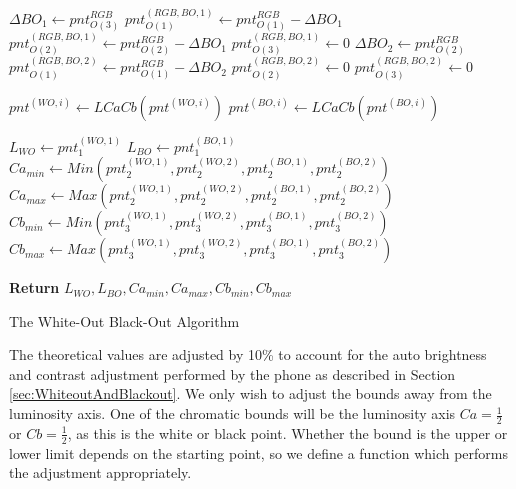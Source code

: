 \begin{algorithm}[H]
\begin{algorithmic}
     
   \State  $\Delta BO_1 \gets  pnt^{RGB}_{O(3)} $ 
   \State  \phantom{Set}$pnt^{(RGB, BO, 1)}_{O(1)} \gets  pnt^{RGB} _{O(1)} - \Delta BO_1  $ 
   \State \phantom{Set} $pnt^{(RGB, BO, 1)}_{O(2)} \gets  pnt^{RGB} _{O(2)} - \Delta BO_1 $ 
   \State \phantom{Set} $pnt^{(RGB, BO, 1)}_{O(3)} \gets  0 $ 
   \State  $\Delta BO_2 \gets pnt^{RGB}_{O(2)} $ 
   \State  \phantom{Set} $pnt^{(RGB, BO, 2)}_{O(1)} \gets pnt^{RGB} _{O(1)} - \Delta BO_2 $ 
   \State  \phantom{Set} $pnt^{(RGB, BO, 2)}_{O(2)} \gets 0 $ 
   \State  \phantom{Set} $pnt^{(RGB, BO, 2)}_{O(3)} \gets 0 $ 
     
   \State  $pnt^{(WO, i)}\gets LCaCb(pnt^{(WO, i)}) $ 
   \State  $pnt^{(BO, i)}\gets LCaCb(pnt^{(BO, i)}) $ 
   
   \State  $L_{WO} \gets pnt^{(WO, 1)}_1$ 
   \State  $L_{BO} \gets pnt^{(BO, 1)}_1$ 
   \State  $Ca_{min}  \gets Min(pnt^{(WO, 1)}_2, pnt^{(WO, 2)}_2, pnt^{(BO, 1)}_2, pnt^{(BO, 2)}_2 )$ 
   \State  $Ca_{max} \gets Max(pnt^{(WO, 1)}_2, pnt^{(WO, 2)}_2, pnt^{(BO, 1)}_2, pnt^{(BO, 2)}_2 )$ 
   \State  $Cb_{min}  \gets Min(pnt^{(WO, 1)}_3, pnt^{(WO, 2)}_3, pnt^{(BO, 1)}_3, pnt^{(BO, 2)}_3 )$ 
   \State  $Cb_{max} \gets Max(pnt^{(WO, 1)}_3, pnt^{(WO, 2)}_3, pnt^{(BO, 1)}_3, pnt^{(BO, 2)}_3 )$ 
     
  \State \textbf{Return} {$L_{WO} , L_{BO} , Ca_{min}, Ca_{max} , Cb_{min}, Cb_{max}$ }
 
  \end{algorithmic}
    \caption{The White-Out Black-Out Algorithm}
    \label{algo:TheWhiteoutBlackoutAlgorithm}
 \end{algorithm}
 
 The theoretical values are adjusted by 10\% to account for the auto brightness and contrast adjustment performed by the phone as described in Section \ref{sec:WhiteoutAndBlackout}. We only wish to adjust the bounds away from the luminosity axis. One of the chromatic bounds will be the luminosity axis $Ca=\frac{1}{2}$ or  $Cb=\frac{1}{2}$, as this is the white or black point. Whether the bound is the upper or lower limit depends on the starting point, so we define a function which performs the adjustment appropriately.
 
